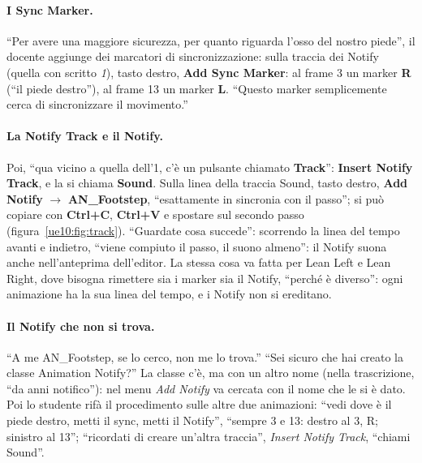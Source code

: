 \paragraph{I Sync Marker.} ``Per avere una maggiore sicurezza, per quanto riguarda l'osso
del nostro piede'', il docente aggiunge dei marcatori di sincronizzazione: sulla traccia
dei Notify (quella con scritto \emph{1}), tasto destro, \textbf{Add Sync Marker}: al frame
3 un marker \textbf{R} (``il piede destro''), al frame 13 un marker \textbf{L}. ``Questo
marker semplicemente cerca di sincronizzare il movimento.''

\paragraph{La Notify Track e il Notify.} Poi, ``qua vicino a quella dell'1, c'è un pulsante
chiamato \textbf{Track}'': \textbf{Insert Notify Track}, e la si chiama \textbf{Sound}. Sulla
linea della traccia Sound, tasto destro, \textbf{Add Notify} $\rightarrow$
\textbf{AN\_Footstep}, ``esattamente in sincronia con il passo''; si può copiare con
\textbf{Ctrl+C}, \textbf{Ctrl+V} e spostare sul secondo passo
(figura~\ref{ue10:fig:track}). ``Guardate cosa succede'': scorrendo la linea del tempo
avanti e indietro, ``viene compiuto il passo, il suono almeno'': il Notify suona anche
nell'anteprima dell'editor. La stessa cosa va fatta per Lean Left e Lean Right, dove
bisogna rimettere sia i marker sia il Notify, ``perché è diverso'': ogni animazione ha la
sua linea del tempo, e i Notify non si ereditano.

\paragraph{Il Notify che non si trova.} ``A me AN\_Footstep, se lo cerco, non me lo
trova.'' ``Sei sicuro che hai creato la classe Animation Notify?'' La classe c'è, ma con un
altro nome (nella trascrizione, ``da anni notifico''): nel menu \emph{Add Notify} va
cercata con il nome che le si è dato. Poi lo studente rifà il procedimento sulle altre
due animazioni: ``vedi dove è il piede destro, metti il sync, metti il Notify'', ``sempre
3 e 13: destro al 3, R; sinistro al 13''; ``ricordati di creare un'altra traccia'',
\emph{Insert Notify Track}, ``chiami Sound''.

